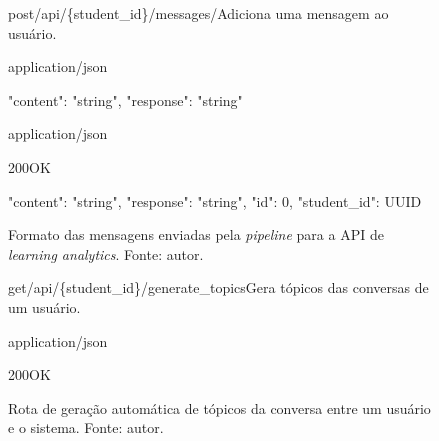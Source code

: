 \documentclass[journal]{IEEEtran}
\begin{document}
\begin{figure}[ht]
    \centering
    \begin{apiRoute}{post}{/api/\{student\_id\}/messages/}{Adiciona uma mensagem ao usuário.}
        \begin{routeParameter}
        \end{routeParameter}

        \begin{routeRequest}{application/json}
            \begin{routeRequestBody}
{
    "content": "string",
    "response": "string"
}
            \end{routeRequestBody}
        \end{routeRequest}

        \begin{routeResponse}{application/json}
            \begin{routeResponseItem}{200}{OK}
                \begin{routeResponseItemBody}
{
  "content": "string",
  "response": "string",
  "id": 0,
  "student_id": UUID
}
                \end{routeResponseItemBody}
            \end{routeResponseItem}
        \end{routeResponse}
    \end{apiRoute}
    \caption{%
    Formato das mensagens enviadas pela \textit{pipeline} para a API de \textit{learning analytics}. Fonte: autor.\label{fig:api_messages}}
\end{figure}

\begin{figure}[ht]
    \centering
    \begin{apiRoute}{get}{/api/\{student\_id\}/generate\_topics}{Gera tópicos das conversas de um usuário.}
        \begin{routeParameter}
        \end{routeParameter}

        \begin{routeResponse}{application/json}
            \begin{routeResponseItem}{200}{OK}
                \begin{routeResponseItemBody}
[ "string" ]
                \end{routeResponseItemBody}
            \end{routeResponseItem}
        \end{routeResponse}
    \end{apiRoute}
    \caption{%
    Rota de geração automática de tópicos da conversa entre um usuário e o sistema. Fonte: autor.\label{fig:api_topics}}
\end{figure}
\end{document}
